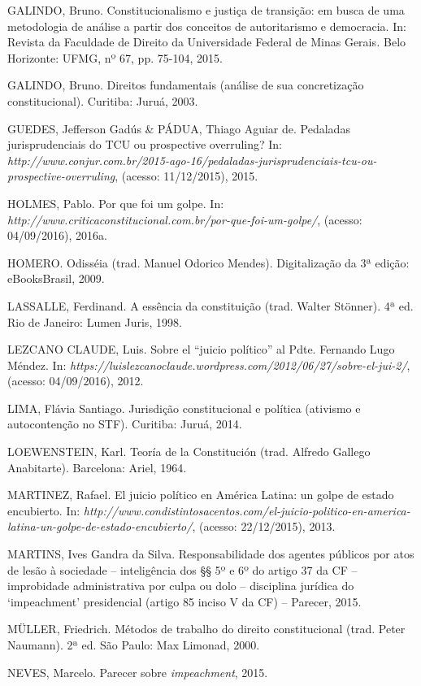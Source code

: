 GALINDO, Bruno. Constitucionalismo e justiça de transição: em busca de
uma metodologia de análise a partir dos conceitos de autoritarismo e
democracia. In: Revista da Faculdade de Direito da Universidade Federal
de Minas Gerais\emph{.} Belo Horizonte: UFMG, nº 67, pp. 75-104, 2015.

GALINDO, Bruno. Direitos fundamentais (análise de sua concretização
constitucional). Curitiba: Juruá, 2003.

GUEDES, Jefferson Gadús \& PÁDUA, Thiago Aguiar de. Pedaladas
jurisprudenciais do TCU ou prospective overruling? In:
\emph{http://www.conjur.com.br/2015-ago-16/pedaladas-jurisprudenciais-tcu-ou-prospective-overruling},
(acesso: 11/12/2015), 2015.

HOLMES, Pablo. Por que foi um golpe. In:
\emph{http://www.criticaconstitucional.com.br/por-que-foi-um-golpe/},
(acesso: 04/09/2016), 2016a.

HOMERO. Odisséia (trad. Manuel Odorico Mendes). Digitalização da 3ª
edição: eBooksBrasil, 2009.

LASSALLE, Ferdinand. A essência da constituição (trad. Walter Stönner).
4ª ed. Rio de Janeiro: Lumen Juris, 1998.

LEZCANO CLAUDE, Luis. Sobre el ``juicio político'' al Pdte. Fernando
Lugo Méndez. In:
\emph{https://luislezcanoclaude.wordpress.com/2012/06/27/sobre-el-jui-2/},
(acesso: 04/09/2016), 2012.

LIMA, Flávia Santiago. Jurisdição constitucional e política (ativismo e
autocontenção no STF). Curitiba: Juruá, 2014.

LOEWENSTEIN, Karl. Teoría de la Constitución (trad. Alfredo Gallego
Anabitarte). Barcelona: Ariel, 1964.

MARTINEZ, Rafael. El juicio político en América
Latina: un golpe de estado encubierto. In:
\emph{http://www.condistintosacentos.com/el-juicio-politico-en-america-latina-un-golpe-de-estado-encubierto/},
(acesso: 22/12/2015),
2013.

MARTINS, Ives Gandra da Silva. Responsabilidade dos agentes públicos por
atos de lesão à sociedade -- inteligência dos §§ 5º e 6º do artigo 37 da
CF -- improbidade administrativa por culpa ou dolo -- disciplina
jurídica do `impeachment' presidencial (artigo 85 inciso V da CF) --
Parecer, 2015.

MÜLLER, Friedrich. Métodos de trabalho do direito constitucional (trad.
Peter Naumann). 2ª ed. São Paulo: Max Limonad, 2000.

NEVES, Marcelo. Parecer sobre \emph{impeachment}, 2015.

